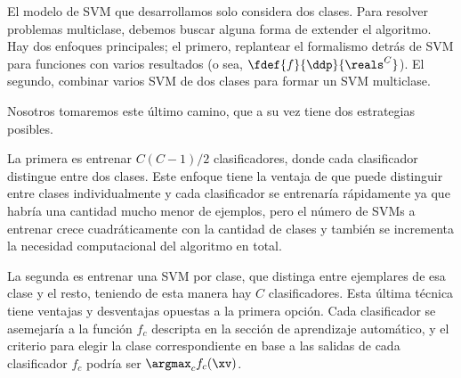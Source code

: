 El modelo de SVM que desarrollamos solo considera dos clases. Para resolver problemas multiclase, debemos buscar alguna forma de extender el algoritmo. Hay dos enfoques principales; el primero, replantear el formalismo detrás de SVM para funciones con varios resultados (o sea, $\fdef{f}{\ddp}{\reals^C}$). El segundo, combinar varios SVM de dos clases para formar un SVM multiclase.

Nosotros tomaremos este último camino, que a su vez tiene dos estrategias posibles.

La primera es entrenar $C(C-1)/2$ clasificadores, donde cada clasificador distingue entre dos clases. Este enfoque tiene la ventaja de que puede distinguir entre clases individualmente y cada clasificador se entrenaría rápidamente ya que habría una cantidad mucho menor de ejemplos, pero el número de SVMs a entrenar crece cuadráticamente con la cantidad de clases y también se incrementa la necesidad computacional del algoritmo en total.

La segunda es entrenar una SVM por clase, que distinga entre ejemplares de esa clase y el resto, teniendo de esta manera hay $C$ clasificadores. Esta última técnica tiene ventajas y desventajas opuestas a la primera opción. Cada clasificador se asemejaría a la función $f_c$ descripta en la sección de aprendizaje automático, y el criterio para elegir la clase correspondiente en base a las salidas de cada clasificador $f_c$ podría ser $ \argmax_c f_c(\xv)$.
